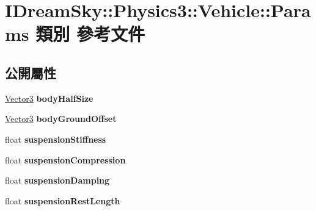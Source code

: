 \hypertarget{class_i_dream_sky_1_1_physics3_1_1_vehicle_1_1_params}{}\section{I\+Dream\+Sky\+:\+:Physics3\+:\+:Vehicle\+:\+:Params 類別 參考文件}
\label{class_i_dream_sky_1_1_physics3_1_1_vehicle_1_1_params}
\subsection*{公開屬性}
\begin{DoxyCompactItemize}
\item 
\hyperlink{class_i_dream_sky_1_1_vector3}{Vector3} {\bfseries body\+Half\+Size}\hypertarget{class_i_dream_sky_1_1_physics3_1_1_vehicle_1_1_params_aea7ea7014d9beb0a6f5a109d806ad9b0}{}\label{class_i_dream_sky_1_1_physics3_1_1_vehicle_1_1_params_aea7ea7014d9beb0a6f5a109d806ad9b0}

\item 
\hyperlink{class_i_dream_sky_1_1_vector3}{Vector3} {\bfseries body\+Ground\+Offset}\hypertarget{class_i_dream_sky_1_1_physics3_1_1_vehicle_1_1_params_a55a654eec7314952fdb3bc12b616497b}{}\label{class_i_dream_sky_1_1_physics3_1_1_vehicle_1_1_params_a55a654eec7314952fdb3bc12b616497b}

\item 
float {\bfseries suspension\+Stiffness}\hypertarget{class_i_dream_sky_1_1_physics3_1_1_vehicle_1_1_params_a6fb3efd5ee6a2e993bf965f2fcea97b7}{}\label{class_i_dream_sky_1_1_physics3_1_1_vehicle_1_1_params_a6fb3efd5ee6a2e993bf965f2fcea97b7}

\item 
float {\bfseries suspension\+Compression}\hypertarget{class_i_dream_sky_1_1_physics3_1_1_vehicle_1_1_params_a660aa16e90a076edc53f9b2d4806eab0}{}\label{class_i_dream_sky_1_1_physics3_1_1_vehicle_1_1_params_a660aa16e90a076edc53f9b2d4806eab0}

\item 
float {\bfseries suspension\+Damping}\hypertarget{class_i_dream_sky_1_1_physics3_1_1_vehicle_1_1_params_a2fc0fb7b4056706d89dce49c59680bca}{}\label{class_i_dream_sky_1_1_physics3_1_1_vehicle_1_1_params_a2fc0fb7b4056706d89dce49c59680bca}

\item 
float {\bfseries suspension\+Rest\+Length}\hypertarget{class_i_dream_sky_1_1_physics3_1_1_vehicle_1_1_params_a13e9a4d2fedd9d56b4af51848dfb25d1}{}\label{class_i_dream_sky_1_1_physics3_1_1_vehicle_1_1_params_a13e9a4d2fedd9d56b4af51848dfb25d1}


\end{DoxyCompactItemize}
